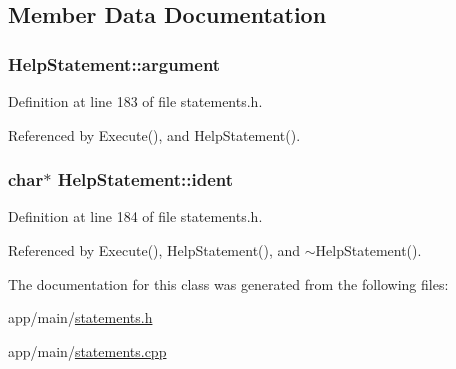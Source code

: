 \subsection{Member Data Documentation}
\subsubsection[{\texorpdfstring{argument}{argument}}]{ Help\+Statement\+::argument\hspace{0.3cm}{\ttfamily [private]}}\hypertarget{classHelpStatement_abef33224fd4d73c2501217dba61dd395}{}\label{classHelpStatement_abef33224fd4d73c2501217dba61dd395}


Definition at line 183 of file statements.\+h.



Referenced by Execute(), and Help\+Statement().

\subsubsection[{\texorpdfstring{ident}{ident}}]{\setlength{\rightskip}{0pt plus 5cm}char$\ast$ Help\+Statement\+::ident\hspace{0.3cm}{\ttfamily [private]}}\hypertarget{classHelpStatement_a464f49dcbd47d1050df5b822aaffc839}{}\label{classHelpStatement_a464f49dcbd47d1050df5b822aaffc839}


Definition at line 184 of file statements.\+h.



Referenced by Execute(), Help\+Statement(), and $\sim$\+Help\+Statement().



The documentation for this class was generated from the following files\+:\begin{DoxyCompactItemize}
\item 
app/main/\hyperlink{statements_8h}{statements.\+h}\item 
app/main/\hyperlink{statements_8cpp}{statements.\+cpp}\end{DoxyCompactItemize}
